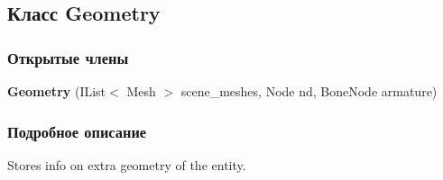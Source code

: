 \subsection{Класс Geometry}
\label{class_win_form_animation2_d_1_1_geometry}
\subsubsection*{Открытые члены}
\begin{DoxyCompactItemize}
\item 
{\bf Geometry} (I\+List$<$ Mesh $>$ scene\+\_\+meshes, Node nd, Bone\+Node armature)\label{class_win_form_animation2_d_1_1_geometry_abd05402398b233a02784515ecd0d329e}

\end{DoxyCompactItemize}


\subsubsection{Подробное описание}
Stores info on extra geometry of the entity. 